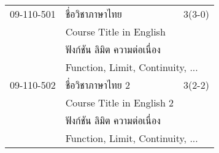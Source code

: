 \begin{longtable}{p{}p{}r{}}
09-110-501 & ชื่อวิชาภาษาไทย & 3(3-0)\\*
 & Course Title in English & \phantom{x} \vspace{3mm} \\*
&  \multicolumn{2}{p{0.75\textwidth}}{ฟังก์ชัน ลิมิต ความต่อเนื่อง} \vspace{3mm} \\*
&  \multicolumn{2}{p{0.75\textwidth}}{Function, Limit, Continuity, ... } \vspace{8mm} \\*
09-110-502 & ชื่อวิชาภาษาไทย 2 & 3(2-2)\\*
 & Course Title in English 2 & \phantom{x} \vspace{3mm} \\*
&  \multicolumn{2}{p{0.75\textwidth}}{ฟังก์ชัน ลิมิต ความต่อเนื่อง} \vspace{3mm} \\*
&  \multicolumn{2}{p{0.75\textwidth}}{Function, Limit, Continuity, ... } \vspace{8mm} \\*
\end{longtable}
